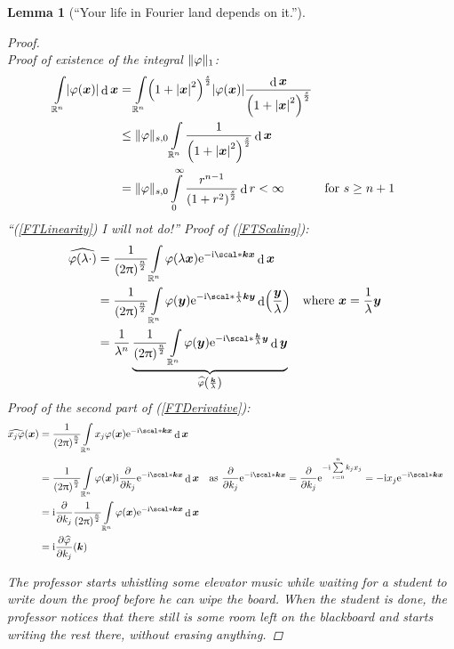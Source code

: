 \documentclass[10pt]{article}
\newtheorem*{lemma}{Lemma}
\DeclarePairedDelimiter\norm{\Vert}{\Vert}
\DeclarePairedDelimiter\abs{\lvert}{\rvert}
\DeclarePairedDelimiter\of{\lparen}{\rparen}
\newcommand{\R}{\mathbb{R}}
\newcommand{\Rn}{{\R^n}}
\DeclareMathOperator{\diffd}{d}
\newcommand\gl\lambda
\newcommand\gj\varphi
\newcommand{\bx}{{\vectorsym x}}
\newcommand{\by}{{\vectorsym y}}
\newcommand{\bk}{{\vectorsym k}}
\newcommand\ft\widehat
\newcommand\Int[1]{\int\limits_#1}
\newcommand{\Sum}{\sum\limits}
\newcommand\fstpartial[2][]{\frac{\partial #1}{\partial #2}}
\newcommand\I{\mathrm{i}}
\newcommand\E{\mathrm{e}}
\newcommand{\ftnrm}{\frac{1}{\of*{2\pi}^\frac{n}{2}} }
\begin{document}
\begin{lemma}[``Your life in Fourier land depends on it.'']
\begin{proof}
\begin{equation*}
      \end{equation*}
      Proof of existence of the integral $\norm\gj_1$:
      \begin{align*}
        \Int\Rn\abs*{\gj\of*\bx}\diffd\bx 
        &= \Int\Rn\of*{1+\abs*{\bx}^2}^\frac{s}{2}\abs*{\gj\of*\bx}
        \frac{\diffd\bx}{\of*{1+\abs*{\bx}^2}^\frac{s}{2}}  \\
        &\leq \norm{\gj}_{s,0} \Int\Rn\frac{1}{\of*{1+\abs*{\bx}^2}^\frac{s}{2}}\diffd\bx\\
        &= \norm{\gj}_{s,0} \Int{0}^\infty\frac{r^{n-1}}{\of*{1+r^2}^\frac{s}{2}}\diffd r
        < \infty &&\text{for } s\geq n+1
      \end{align*}
      ``(\ref{FTLinearity}) I will not do!''
      Proof of (\ref{FTScaling}):
      \begin{align*}
        \ft{\gj\of*{\gl\cdot}} 
        &= \ftnrm\Int\Rn\gj\of*{\gl\bx}\E^{-\I\scal*\bk\bx} \diffd\bx \\
        &= \frac{1}{\of*{2\pi}^\frac{n}{2}}
          \Int\Rn\gj\of*\by\E^{-\I\scal*{\frac 1\gl\bk}{\by}} \diffd\of*{\frac{\by}{\gl}}
          && \text{where } \bx=\frac{1}{\gl}\by \\
        &= \frac{1}{\gl^n} \underbrace{
          \ftnrm\Int\Rn\gj\of*\by\E^{-\I\scal*{\frac\bk\gl}\by}
          \diffd\by}_{\ft\gj\of*{\frac\bk{\gl}}}
      \end{align*}
      Proof of the second part of (\ref{FTDerivative}):
      \begin{align*}
        \ft{x_j\gj}\of*\bx 
        &= \ftnrm\Int\Rn x_j\gj\of*{\bx}\E^{-\I\scal*\bk\bx}\diffd\bx \\
        &= \ftnrm
          \Int\Rn\gj\of*{\bx}\I\fstpartial{k_j}\E^{-\I\scal*\bk\bx} \diffd\bx 
          && \text{as }\fstpartial{k_j}\E^{-\I\scal*\bk\bx} =
            \fstpartial{k_j}\E^{-\I\Sum_{r=0}^n k_j x_j}=-\I x_j \E^{-\I\scal*\bk\bx}\\
        &= \I\fstpartial{k_j}\ftnrm
          \Int\Rn\gj\of*\bx\E^{-\I\scal*\bk\bx} \diffd\bx \\
        &= \I\fstpartial[\ft\gj]{k_j}\of*\bk
      \end{align*}
      
      \emph{The professor starts whistling some elevator music while waiting for a student to write down the proof before he can wipe the board. When the student is done, the professor notices that there still is some room left on the blackboard and starts writing the rest there, without erasing anything.}
      

\end{proof}
\end{lemma}
\end{document}

